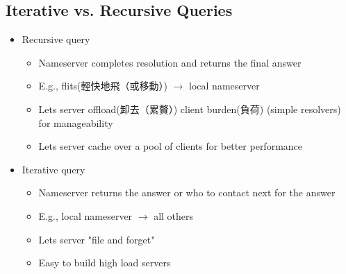 \documentclass[12pt]{ctexart}   %
\begin{document}
	\subsection{Iterative vs. Recursive Queries}
	\begin{itemize}
		\item Recursive query
		\begin{itemize}
			\item Nameserver completes resolution and returns the final answer
			\item E.g., flits(輕快地飛（或移動）) $\rightarrow$ local nameserver
			
			\item Lets server offload(卸去（累贅）) client burden(負荷) (simple resolvers) for manageability
			\item Lets server cache over a pool of clients for better performance
		\end{itemize}
		
		\item Iterative query
		\begin{itemize}
			\item Nameserver returns the answer or who to contact next for the answer
			\item E.g., local nameserver $\rightarrow$ all others
			
			\item Lets server "file and forget"
			\item Easy to build high load servers
		\end{itemize}
	\end{itemize}
	
\end{document}
